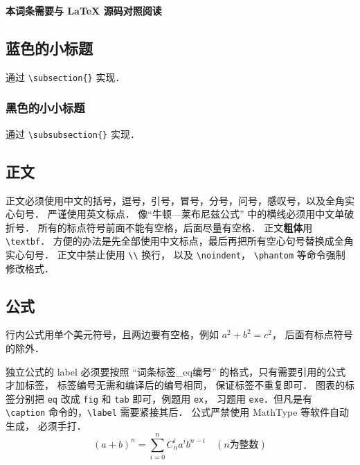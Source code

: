 

\textbf{本词条需要与 LaTeX 源码对照阅读}

\subsection{蓝色的小标题}
通过 \lstinline|\subsection{}| 实现．
\subsubsection{黑色的小小标题}
通过 \lstinline|\subsubsection{}| 实现．

\subsection{正文}

正文必须使用中文的括号，逗号，引号，冒号，分号，问号，感叹号，以及全角实心句号． 严谨使用英文标点． 像“牛顿—莱布尼兹公式” 中的横线必须用中文单破折号． 所有的标点符号前面不能有空格，后面尽量有空格． 正文\textbf{粗体}用 \lstinline|\textbf|． 方便的办法是先全部使用中文标点，最后再把所有空心句号替换成全角实心句号． 正文中禁止使用 \lstinline|\\| 换行， 以及 \lstinline|\noindent|， \lstinline|\phantom| 等命令强制修改格式．

\subsection{公式}
行内公式用单个美元符号，且两边要有空格，例如 $a^2+b^2=c^2$， 后面有标点符号的除外．

独立公式的 label 必须要按照 “词条标签\_eq编号” 的格式，只有需要引用的公式才加标签， 标签编号无需和编译后的编号相同， 保证标签不重复即可． 图表的标签分别把 \lstinline|eq| 改成 \lstinline|fig| 和 \lstinline|tab| 即可，例题用 \lstinline|ex|， 习题用 \lstinline|exe|．但凡是有 \lstinline|\caption| 命令的，\lstinline|\label| 需要紧接其后． 公式严禁使用 MathType 等软件自动生成， 必须手打．
\begin{equation}\label{Sample_eq1}
(a+b)^n = \sum_{i=0}^n C_n^i a^i b^{n-i} \quad (n\text{为整数})
\end{equation}

